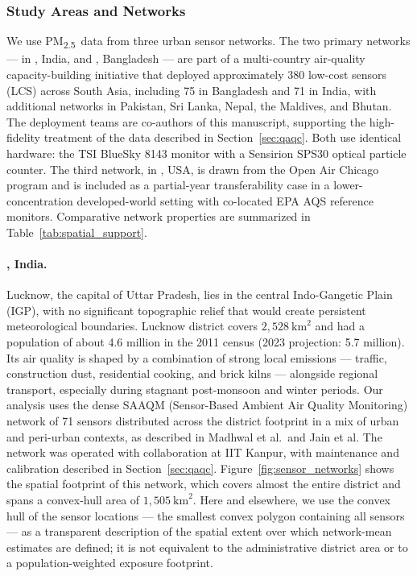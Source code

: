 \documentclass[12pt]{article}
\theoremstyle{remark}
\newcommand{\pmtt}{\textrm{PM\textsubscript{2.5}}}
\newcommand{\city}[1]{\capitalisewords{\MakeLowercase{#1}}}
\newcommand{\nLucknow}{71}
\begin{document}
\subsubsection{Study Areas and Networks}\label{sec:networks}
We use \pmtt\ data from three urban sensor networks. The two primary networks --- in \city{Lucknow}, India, and \city{Dhaka}, Bangladesh --- are part of a multi-country air-quality capacity-building initiative that deployed approximately 380 low-cost sensors (LCS) across South Asia, including 75 in Bangladesh and 71 in India, with additional networks in Pakistan, Sri Lanka, Nepal, the Maldives, and Bhutan.\supercite{saeed_sustaining_2025} The deployment teams are co-authors of this manuscript, supporting the high-fidelity treatment of the data described in Section~\ref{sec:qaqc}. Both use identical hardware: the {TSI BlueSky 8143} monitor with a {Sensirion SPS30} optical particle counter.\supercite{jain_hybrid_2024,zaman_comparison_2025} The third network, in \city{Chicago}, USA, is drawn from the Open Air Chicago program and is included as a partial-year transferability case in a lower-concentration developed-world setting with co-located EPA AQS reference monitors. Comparative network properties are summarized in Table~\ref{tab:spatial_support}.

\paragraph{\city{Lucknow}, India.} Lucknow, the capital of Uttar Pradesh, lies in the central Indo-Gangetic Plain (IGP), with no significant topographic relief that would create persistent meteorological boundaries. Lucknow district covers $2{,}528~\mathrm{km}^2$ and had a population of about 4.6 million in the 2011 census (2023 projection: 5.7 million).\supercite{madhwal_evaluation_2024} Its air quality is shaped by a combination of strong local emissions --- traffic, construction dust, residential cooking, and brick kilns --- alongside regional transport, especially during stagnant post-monsoon and winter periods.\supercite{madhwal_evaluation_2024,jain_hybrid_2024} Our analysis uses the dense SAAQM (Sensor-Based Ambient Air Quality Monitoring) network of {\nLucknow} sensors distributed across the district footprint in a mix of urban and peri-urban contexts, as described in Madhwal et al.\ and Jain et al.\supercite{madhwal_evaluation_2024, jain_hybrid_2024} The network was operated with collaboration at IIT Kanpur, with maintenance and calibration described in Section~\ref{sec:qaqc}. Figure~\ref{fig:sensor_networks} shows the spatial footprint of this network, which covers almost the entire district and spans a convex-hull area of $1{,}505~\mathrm{km}^2$. Here and elsewhere, we use the convex hull of the sensor locations --- the smallest convex polygon containing all sensors --- as a transparent description of the spatial extent over which network-mean estimates are defined; it is not equivalent to the administrative district area or to a population-weighted exposure footprint.
\end{document}
